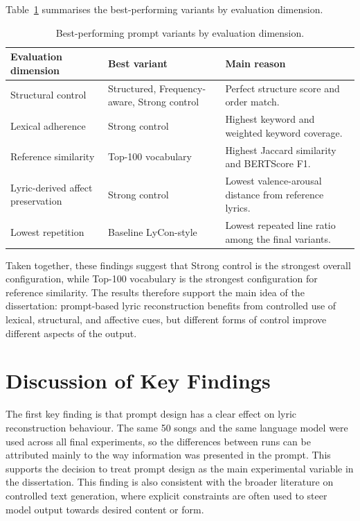 Table~\ref{tab:best_variants_by_dimension} summarises the best-performing variants by evaluation dimension.

\begin{table}[H]
\centering
\renewcommand{\arraystretch}{1.2}
\caption{Best-performing prompt variants by evaluation dimension.}
\label{tab:best_variants_by_dimension}
\begin{tabular}{
>{\raggedright\arraybackslash}p{}
>{\raggedright\arraybackslash}p{}
>{\raggedright\arraybackslash}p{}
}
\hline
Evaluation dimension & Best variant & Main reason \\
\hline
Structural control & Structured, Frequency-aware, Strong control & Perfect structure score and order match. \\
Lexical adherence & Strong control & Highest keyword and weighted keyword coverage. \\
Reference similarity & Top-100 vocabulary & Highest Jaccard similarity and BERTScore F1. \\
Lyric-derived affect preservation & Strong control & Lowest valence-arousal distance from reference lyrics. \\
Lowest repetition & Baseline LyCon-style & Lowest repeated line ratio among the final variants. \\
\hline
\end{tabular}
\renewcommand{\arraystretch}{1.0}
\end{table}

Taken together, these findings suggest that Strong control is the strongest overall configuration, while Top-100 vocabulary is the strongest configuration for reference similarity. The results therefore support the main idea of the dissertation: prompt-based lyric reconstruction benefits from controlled use of lexical, structural, and affective cues, but different forms of control improve different aspects of the output.

\section{Discussion of Key Findings}

The first key finding is that prompt design has a clear effect on lyric reconstruction behaviour. The same 50 songs and the same language model were used across all final experiments, so the differences between runs can be attributed mainly to the way information was presented in the prompt. This supports the decision to treat prompt design as the main experimental variable in the dissertation. This finding is also consistent with the broader literature on controlled text generation, where explicit constraints are often used to steer model output towards desired content or form.

